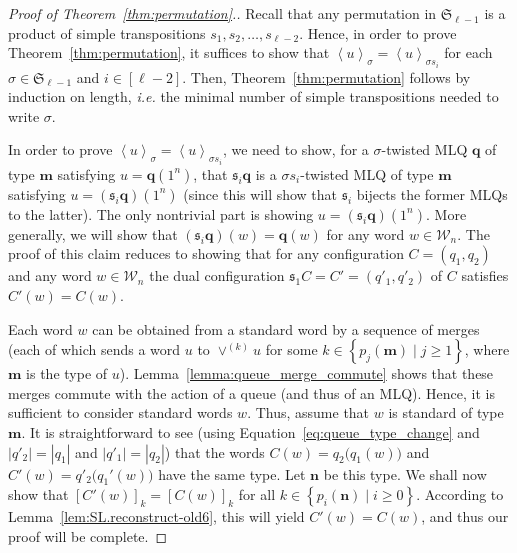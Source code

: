 \documentclass[reqno]{amsart}
\newcommand{\0}{\phantom{c}}
\newcommand{\swt}[1]{\left\langle #1 \right\rangle} %
\newcommand{\SymGp}[1]{\mathfrak{S}_{#1}} %
\newcommand{\mm}{\mathbf{m}}
\newcommand{\nn}{\mathbf{n}}
\newcommand{\qq}{\mathbf{q}}
\newcommand{\mcW}{\mathcal{W}}
\newcommand{\fraks}{\mathfrak{s}}
\newenvironment{verlong}{}{}
\newcommand{\set}[1]{\left\{ #1 \right\}}
\newcommand{\abs}[1]{\left| #1 \right|}
\newcommand{\tup}[1]{\left( #1 \right)}
\newcommand{\ive}[1]{\left[ #1 \right]}
\theoremstyle{plain}
\theoremstyle{definition}
\numberwithin{equation}{section}
\begin{document}
\begin{verlong}
\begin{proof}[Proof of Theorem~\ref{thm:permutation}.]
Recall that any permutation in $\SymGp{\ell-1}$ is a product of simple transpositions $s_1, s_2, \ldots, s_{\ell-2}$.
Hence, in order to prove Theorem~\ref{thm:permutation}, it suffices to show that $\swt{u}_{\sigma} = \swt{u}_{\sigma s_i}$ for each $\sigma \in \SymGp{\ell-1}$ and $i \in \ive{\ell-2}$.
Then, Theorem~\ref{thm:permutation} follows by induction on length, \textit{i.e.} the minimal number of simple transpositions needed to write $\sigma$.

In order to prove $\swt{u}_{\sigma} = \swt{u}_{\sigma s_i}$, we need to show, for a $\sigma$-twisted MLQ $\qq$ of type $\mm$ satisfying $u = \qq (1^n)$, that $\fraks_i \qq$ is a $\sigma s_i$-twisted MLQ of type $\mm$ satisfying $u = (\fraks_i \qq) (1^n)$ (since this will show that $\fraks_i$ bijects the former MLQs to the latter).
The only nontrivial part is showing $u = (\fraks_i\qq) (1^n)$.
More generally, we will show that $(\fraks_i\qq)(w) = \qq(w)$ for any word $w \in \mcW_n$.
The proof of this claim reduces to showing that for any configuration $C = \tup{q_1, q_2}$ and any word $w \in \mcW_n$ the dual configuration $\fraks_1 C = C' = (q'_1, q'_2)$ of $C$ satisfies $C'(w) = C(w)$.

Each word $w$ can be obtained from a standard word by a sequence of
merges (each of which sends a word $u$ to $\vee^{(k)} u$ for some
$k \in \set{ p_j(\mm) \mid j \geq 1 }$, where $\mm$ is the type of
$u$). Lemma~\ref{lemma:queue_merge_commute} shows that these merges
commute with the action of a queue (and thus of an MLQ).
Hence, it is sufficient to consider standard words $w$.
Thus, assume that $w$ is standard of type $\mm$.
It is straightforward to see
(using Equation~\eqref{eq:queue_type_change} and $\abs{q'_2} = \abs{q_1}$ and $\abs{q'_1} = \abs{q_2}$)
that the words
$C(w) = q_2\bigl( q_1(w) \bigr)$
and
$C'(w) = q'_2\bigl( q_1'(w) \bigr)$
have the same type.
Let $\nn$ be this type.
We shall now show that
$[C'(w)]_k = [C(w)]_k$
for all $k \in \set{ p_i(\nn) \mid i \geq 0}$.
According to Lemma~\ref{lem:SL.reconstruct-old6}, this will yield $C'(w) = C(w)$, and thus our proof will be complete.


\end{proof}
\end{verlong}
\end{document}
